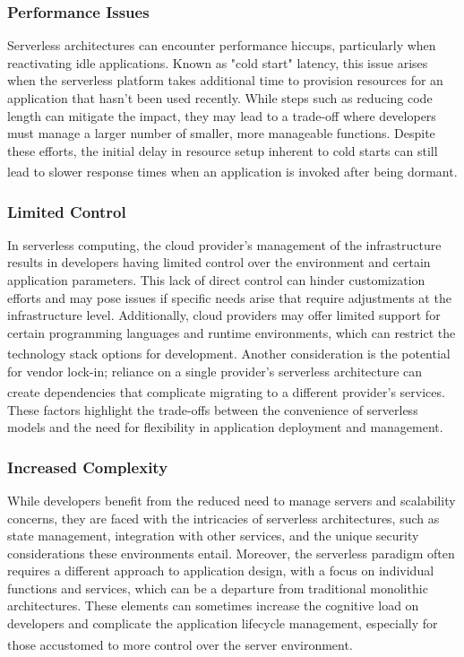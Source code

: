 \subsubsection{Performance Issues}
Serverless architectures can encounter performance hiccups, particularly when reactivating idle
applications. Known as "cold start" latency, this issue arises when the serverless platform takes
additional time to provision resources for an application that hasn't been used recently. While
steps such as reducing code length can mitigate the impact, they may lead to a trade-off where
developers must manage a larger number of smaller, more manageable functions. Despite these efforts,
the initial delay in resource setup inherent to cold starts can still lead to slower response times
when an application is invoked after being dormant\textsuperscript{\cite{serverless_3}}.

\subsubsection{Limited Control}
In serverless computing, the cloud provider's management of the infrastructure results in developers
having limited control over the environment and certain application parameters. This lack of direct
control can hinder customization efforts and may pose issues if specific needs arise that require
adjustments at the infrastructure level. Additionally, cloud providers may offer limited support for
certain programming languages and runtime environments, which can restrict the technology stack
options for development\textsuperscript{\cite{serverless_2}}. Another consideration is the potential
for vendor lock-in; reliance on a single provider's serverless architecture can create dependencies
that complicate migrating to a different provider's services\textsuperscript{\cite{serverless_4}}.
These factors highlight the trade-offs between the convenience of serverless models and the need for
flexibility in application deployment and management.

\subsubsection{Increased Complexity}
While developers benefit from the reduced need to manage servers and scalability concerns, they are
faced with the intricacies of serverless architectures, such as state management, integration with
other services, and the unique security considerations these environments entail. Moreover, the
serverless paradigm often requires a different approach to application design, with a focus on
individual functions and services, which can be a departure from traditional monolithic
architectures. These elements can sometimes increase the cognitive load on developers and complicate
the application lifecycle management, especially for those accustomed to more control over the
server environment\textsuperscript{\cite{serverless_2}}\textsuperscript{\cite{serverless_3}}.

